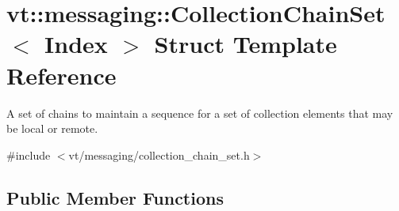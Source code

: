 \hypertarget{classvt_1_1messaging_1_1_collection_chain_set}{}\section{vt\+:\+:messaging\+:\+:Collection\+Chain\+Set$<$ Index $>$ Struct Template Reference}
\label{classvt_1_1messaging_1_1_collection_chain_set}


A set of chains to maintain a sequence for a set of collection elements that may be local or remote.  




{\ttfamily \#include $<$vt/messaging/collection\+\_\+chain\+\_\+set.\+h$>$}

\subsection*{Public Member Functions}
